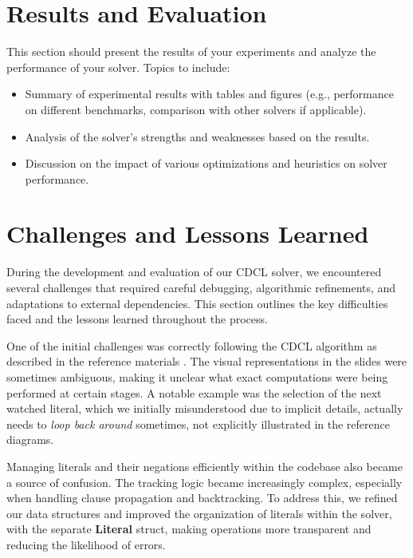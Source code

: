\documentclass[a4paper,12pt]{article}
\begin{document}
\section{Results and Evaluation}
\label{sec:results}
This section should present the results of your experiments and analyze the performance of your solver. Topics to include:
\begin{itemize}
    \item Summary of experimental results with tables and figures (e.g., performance on different benchmarks, comparison with other solvers if applicable).
    \item Analysis of the solver’s strengths and weaknesses based on the results.
    \item Discussion on the impact of various optimizations and heuristics on solver performance.
\end{itemize}

\section{Challenges and Lessons Learned}
\label{sec:challenges}

During the development and evaluation of our CDCL solver, we encountered several challenges that
required careful debugging, algorithmic refinements, and adaptations to external dependencies.
This section outlines the key difficulties faced and the lessons learned throughout the process.

One of the initial challenges was correctly following the CDCL algorithm as described in the
reference materials \cite{CdclAlgorithm}. The visual representations in the slides were
sometimes ambiguous, making it unclear what exact computations were being performed at certain
stages. A notable example was the selection of the next watched literal, which we initially
misunderstood due to implicit details, actually needs to \textit{loop back around} sometimes,
not explicitly illustrated in the reference diagrams.

Managing literals and their negations efficiently within the codebase also became a source of
confusion. The tracking logic became increasingly complex, especially when handling clause
propagation and backtracking. To address this, we refined our data structures and improved
the organization of literals within the solver, with the separate \textbf{Literal} struct,
making operations more transparent and reducing the likelihood of errors.
\end{document}
